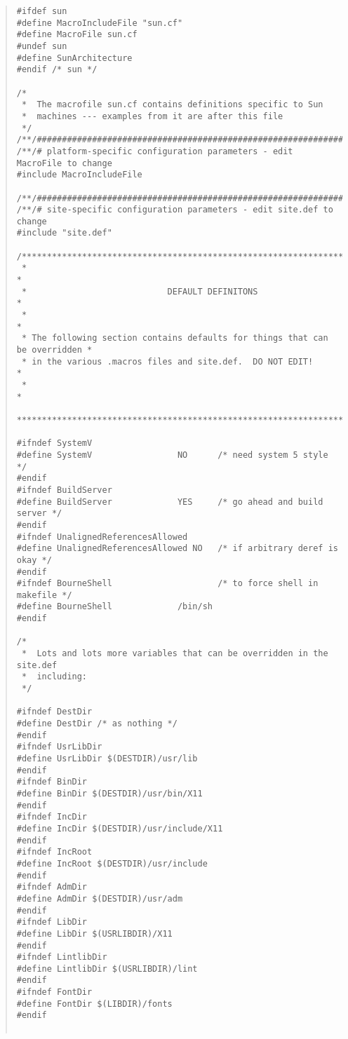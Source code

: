 \begin{quote}
\begin{verbatim}
#ifdef sun
#define MacroIncludeFile "sun.cf"
#define MacroFile sun.cf
#undef sun
#define SunArchitecture
#endif /* sun */

/*
 *  The macrofile sun.cf contains definitions specific to Sun
 *  machines --- examples from it are after this file
 */
/**/###########################################################################
/**/# platform-specific configuration parameters - edit MacroFile to change
#include MacroIncludeFile

/**/###########################################################################
/**/# site-specific configuration parameters - edit site.def to change
#include "site.def"

/*****************************************************************************
 *                                                                           *
 *                            DEFAULT DEFINITONS                             *
 *                                                                           *
 * The following section contains defaults for things that can be overridden *
 * in the various .macros files and site.def.  DO NOT EDIT!                  *
 *                                                                           *
 ****************************************************************************/

#ifndef SystemV
#define SystemV                 NO      /* need system 5 style */
#endif
#ifndef BuildServer
#define BuildServer             YES     /* go ahead and build server */
#endif
#ifndef UnalignedReferencesAllowed
#define UnalignedReferencesAllowed NO   /* if arbitrary deref is okay */
#endif
#ifndef BourneShell                     /* to force shell in makefile */
#define BourneShell             /bin/sh
#endif

/*
 *  Lots and lots more variables that can be overridden in the site.def
 *  including:
 */

#ifndef DestDir
#define DestDir /* as nothing */
#endif
#ifndef UsrLibDir
#define UsrLibDir $(DESTDIR)/usr/lib
#endif
#ifndef BinDir
#define BinDir $(DESTDIR)/usr/bin/X11
#endif
#ifndef IncDir
#define IncDir $(DESTDIR)/usr/include/X11
#endif
#ifndef IncRoot
#define IncRoot $(DESTDIR)/usr/include
#endif
#ifndef AdmDir
#define AdmDir $(DESTDIR)/usr/adm
#endif
#ifndef LibDir
#define LibDir $(USRLIBDIR)/X11
#endif
#ifndef LintlibDir
#define LintlibDir $(USRLIBDIR)/lint
#endif
#ifndef FontDir
#define FontDir $(LIBDIR)/fonts
#endif


\end{verbatim}
\end{quote}
